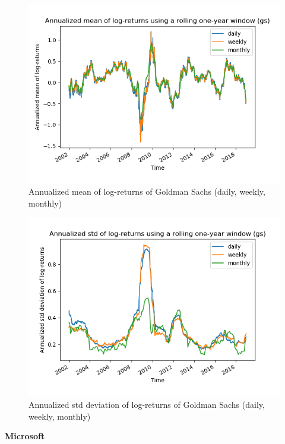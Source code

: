 \documentclass[10pt]{article}
\newenvironment{exercise}[2][Exercise]{\begin{trivlist}
  \item[\hskip \labelsep {\bfseries #1}\hskip \labelsep {\bfseries #2.}]}{\end{trivlist}}
\begin{document}
\begin{exercise}{4}
\begin{figure}[H]
		\centering
		\includegraphics[scale=0.5]{Figures/problem4d_mean_gs.png}	
		\caption{Annualized mean of log-returns of Goldman Sachs (daily, weekly, monthly)}	
		\label{fig:problem3d_mean_gs}
	
	\end{figure}
	
	\begin{figure}[H]
	
		\centering
		\includegraphics[scale=0.5]{Figures/problem4d_std_gs.png}	
		\caption{Annualized std deviation of log-returns of Goldman Sachs (daily, weekly, monthly)}	
		\label{fig:problem3d_std_gs}
	
	\end{figure}

	\bigbreak	
		
	\textbf{Microsoft}
	

\end{exercise}
\end{document}
